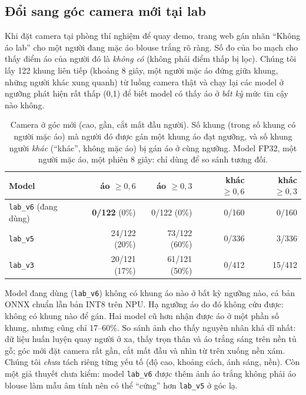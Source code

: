 \documentclass[12pt,a4paper]{article}
\begin{document}
\subsection{Đổi sang góc camera mới tại lab}
\label{sec:angle}

Khi đặt camera tại phòng thí nghiệm để quay demo, trang web gán nhãn ``Không áo lab'' cho một người đang mặc áo blouse trắng rõ ràng. Số đo của
bo mạch cho thấy điểm áo của người đó là \emph{không có} (không phải điểm thấp bị lọc). Chúng tôi lấy 122 khung liên tiếp (khoảng 8 giây, một người mặc
áo đứng giữa khung, những người khác xung quanh) từ luồng camera thật và chạy lại các model ở ngưỡng phát hiện rất thấp (0,1) để biết model có thấy áo ở \emph{bất kỳ}
mức tin cậy nào không.

\begin{table}[ht]
\centering
\caption{Camera ở góc mới (cao, gần, cắt mất đầu người). Số khung (trong số khung có người mặc áo) mà người đó được gán một khung áo đạt ngưỡng,
và số khung người \emph{khác} (``khác'', không mặc áo) bị gán áo ở cùng ngưỡng. Model FP32, một người mặc áo, một phiên 8 giây: chỉ dùng để so sánh tương đối.}
\label{tab:angle}
\small
\begin{tabular}{lrrrr}
\toprule
Model & áo $\ge0{,}6$ & áo $\ge0{,}3$ & khác $\ge0{,}6$ & khác $\ge0{,}3$ \\
\midrule
\texttt{lab\_v6} (đang dùng) & \textbf{0/122} (0\%) & 0/122 (0\%) & 0/160 & 0/160 \\
\texttt{lab\_v5} & 24/122 (20\%) & 73/122 (60\%) & 0/336 & 3/336 \\
\texttt{lab\_v3} & 20/121 (17\%) & 61/121 (50\%) & 0/412 & 15/412 \\
\bottomrule
\end{tabular}
\end{table}

Model đang dùng (\texttt{lab\_v6}) không có khung áo nào ở bất kỳ ngưỡng nào, cả bản ONNX chuẩn lẫn bản INT8 trên NPU. Hạ ngưỡng áo do đó không cứu được:
không có khung nào để gán. Hai model cũ hơn nhận được áo ở một phần số khung, nhưng cũng chỉ 17--60\%. So sánh ảnh cho thấy nguyên nhân khả dĩ nhất:
dữ liệu huấn luyện quay người ở xa, thấy trọn thân và áo trắng sáng trên nền tủ gỗ; góc mới đặt camera rất gần, cắt mất đầu và nhìn từ trên xuống nền xám.
Chúng tôi \emph{chưa} tách riêng từng yếu tố (độ cao, khoảng cách, ánh sáng, nền). Còn một giả thuyết chưa kiểm: model \texttt{lab\_v6} được thêm ảnh áo trắng không phải áo
blouse làm mẫu âm tính nên có thể ``cứng'' hơn \texttt{lab\_v5} ở góc lạ.
\end{document}
